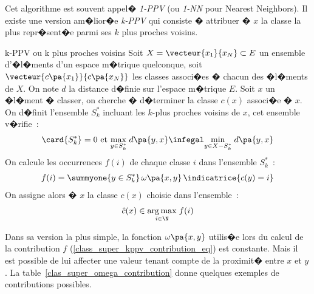 Cet algorithme est souvent appel� \emph{1-PPV} (ou \emph{1-NN} pour Nearest Neighbors). Il existe une version am�lior�e \emph{k-PPV} qui consiste � attribuer � $x$ la classe la plus repr�sent�e parmi ses $k$ plus proches voisins.



        \begin{xalgorithm}{k-PPV ou k plus proches voisins}
        \label{clas_super_kppv_simple}
        Soit $X = \vecteur{x_1}{x_N} \subset E$ un ensemble d'�l�ments d'un espace m�trique quelconque, 
        soit $\vecteur{c\pa{x_1}}{c\pa{x_N}}$ les classes associ�es � chacun des �l�ments de $X$. On note 
        $d$ la distance d�finie sur l'espace m�trique $E$. Soit $x$
        un �l�ment � classer, on cherche � d�terminer la classe $c(x)$ associ�e � $x$. On d�finit l'ensemble $S^*_k$
        incluant les $k$-plus proches voisins de $x$, cet ensemble v�rifie~:
                        \begin{eqnarray*}
                        \card{S^*_k} = 0 \text{ et } 
                                                                         \underset{y \in S^*_k}{\max} \; d\pa{y,x} \infegal
                                                                         \underset{y \in X - S^*_k}{\min} \; d\pa{y,x} 
                        \end{eqnarray*}
        On calcule les occurrences $f(i)$ de chaque classe $i$ dans l'ensemble $S^*_k$~: 
                        \begin{eqnarray}
                        f(i) = \summyone{y \in S^*_k} \, \omega\pa{x,y} \, \indicatrice{c(y) = i} 
                        \label{class_super_kppv_contribution_eq}
                        \end{eqnarray}
        On assigne alors � $x$ la classe $c(x)$ choisie dans l'ensemble~:
                        \begin{eqnarray*}
                        \hat{c}(x) \in \underset{i \in \N}{\arg \max} \; f(i)
                        \end{eqnarray*}
        \end{xalgorithm}

Dans sa version la plus simple, la fonction $\omega\pa{x,y}$ utilis�e lors du calcul de la contribution $f$ (\ref{class_super_kppv_contribution_eq}) est constante. Mais il est possible de lui affecter une valeur tenant compte de la proximit� entre $x$ et $y$. La table~\ref{clas_super_omega_contribution} donne quelques exemples de contributions possibles.


